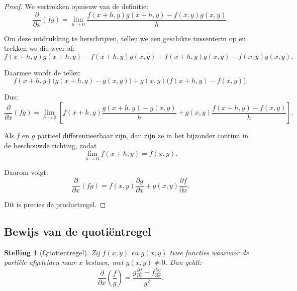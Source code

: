 \documentclass[11pt,a4paper]{article}
\newtheorem{theorem}{Stelling}[section]
\begin{document}
    \begin{proof}
        We vertrekken opnieuw van de definitie:
        \[
            \frac{\partial}{\partial x}(fg)
            =
            \lim_{h\to0}
            \frac{f(x+h,y)g(x+h,y)-f(x,y)g(x,y)}{h}.
        \]

        Om deze uitdrukking te herschrijven, tellen we een geschikte tussenterm op en trekken
        we die weer af:
        \[
            f(x+h,y)g(x+h,y)-f(x+h,y)g(x,y)+f(x+h,y)g(x,y)-f(x,y)g(x,y).
        \]

        Daarmee wordt de teller:
        \[
            f(x+h,y)\bigl(g(x+h,y)-g(x,y)\bigr)
            +
            g(x,y)\bigl(f(x+h,y)-f(x,y)\bigr).
        \]

        Dus:
        \[
            \frac{\partial}{\partial x}(fg)
            =
            \lim_{h\to0}
            \left[
                f(x+h,y)\frac{g(x+h,y)-g(x,y)}{h}
                +
                g(x,y)\frac{f(x+h,y)-f(x,y)}{h}
            \right].
        \]

        Als $f$ en $g$ partieel differentieerbaar zijn, dan zijn ze in het bijzonder continu
        in de beschouwde richting, zodat
        \[
            \lim_{h\to0} f(x+h,y)=f(x,y).
        \]

        Daarom volgt:
        \[
            \frac{\partial}{\partial x}(fg)
            =
            f(x,y)\frac{\partial g}{\partial x}
            +
            g(x,y)\frac{\partial f}{\partial x}.
        \]

        Dit is precies de productregel.
    \end{proof}

    \subsection{Bewijs van de quoti\"entregel}

    \begin{theorem}[Quoti\"entregel]
Zij $f(x,y)$ en $g(x,y)$ twee functies waarvoor de partiële afgeleiden naar $x$ bestaan,
met $g(x,y)\neq 0$. Dan geldt:
\[
    \frac{\partial}{\partial x}\left(\frac{f}{g}\right)
    =
    \frac{
        g\frac{\partial f}{\partial x}
        -
        f\frac{\partial g}{\partial x}
    }{g^2}.
\]
    \end{theorem}
\end{document}
